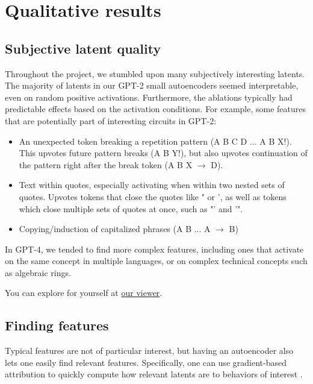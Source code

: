 
\section{Qualitative results}

\subsection{Subjective latent quality}
\label{sec:samples}

Throughout the project, we stumbled upon many subjectively interesting latents.  The majority of latents in our GPT-2 small autoencoders seemed interpretable, even on random positive activations. Furthermore, the ablations typically had predictable effects based on the activation conditions.  For example, some features that are potentially part of interesting circuits in GPT-2:

\begin{itemize}
\item An unexpected token breaking a repetition pattern (A B C D ... A B X!).  This upvotes future pattern breaks (A B Y!), but also upvotes continuation of the pattern right after the break token (A B X $\rightarrow$ D).
\item Text within quotes, especially activating when within two nested sets of quotes.  Upvotes tokens that close the quotes like " or ', as well as tokens which close multiple sets of quotes at once, such as "' and '".  
\item Copying/induction of capitalized phrases (A B ... A $\rightarrow$ B)
\end{itemize}

In GPT-4, we tended to find more complex features, including ones that activate on the same concept in multiple languages, or on complex technical concepts such as algebraic rings.

You can explore for yourself at \href{https://openaipublic.blob.core.windows.net/sparse-autoencoder/sae-viewer/index.html}{our viewer}.

\subsection{Finding features}
\label{sec:finding_features}

Typical features are not of particular interest, but having an autoencoder also lets one easily find relevant features.  Specifically, one can use gradient-based attribution to quickly compute how relevant latents are to behaviors of interest \citep{baehrens2010explain,simonyan2013deep}.


